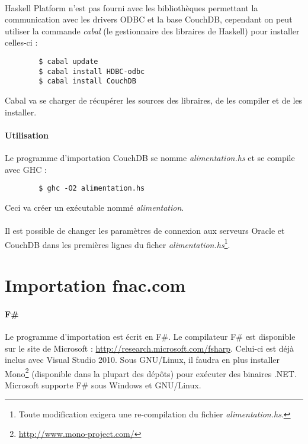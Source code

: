 \documentclass[a4paper,12pt,french]{article}
\begin{document}
    \paragraph{}
    Haskell Platform n'est pas fourni avec les bibliothèques permettant la
communication avec les drivers ODBC et la base CouchDB,  cependant on peut
utiliser la commande \textit{cabal} (le gestionnaire des libraires de Haskell)
pour installer celles-ci :
    \begin{lstlisting}
        $ cabal update
        $ cabal install HDBC-odbc
        $ cabal install CouchDB
    \end{lstlisting}
    Cabal va se charger de récupérer les sources des libraires, de les compiler
et de les installer.

    \paragraph{Utilisation}
    Le programme d'importation CouchDB se nomme \textit{alimentation.hs} et se
compile avec GHC :
    \begin{lstlisting}
        $ ghc -O2 alimentation.hs
    \end{lstlisting}
    Ceci va créer un exécutable nommé \textit{alimentation}.

    \paragraph{}
    Il est possible de changer les paramètres de connexion aux serveurs
Oracle et CouchDB dans les premières lignes du ficher
\textit{alimentation.hs}\footnote{Toute modification exigera une re-compilation
du fichier \textit{alimentation.hs}.}.
    
\section{Importation fnac.com}

    \paragraph{F\#}
    Le programme d'importation est écrit en F\#. Le compilateur F\# est
disponible sur le site de Microsoft :
\url{http://research.microsoft.com/fsharp}. Celui-ci est déjà inclus avec
Visual Studio 2010. Sous GNU/Linux, il faudra en plus installer
Mono\footnote{\url{http://www.mono-project.com/}} (disponible dans la plupart
des dépôts) pour exécuter des binaires .NET. Microsoft supporte F\# sous Windows
et GNU/Linux.
\end{document}
